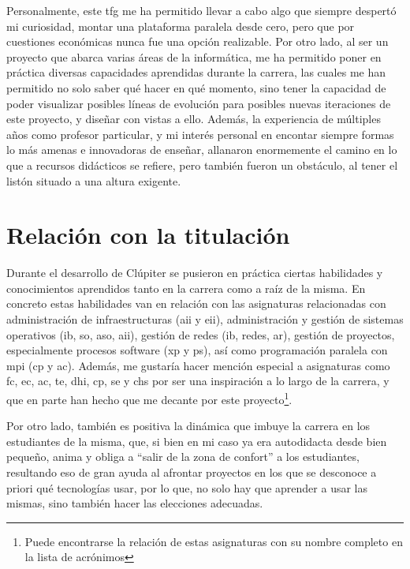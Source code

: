 Personalmente, este \acrshort{tfg} me ha permitido llevar a cabo algo que siempre despertó mi curiosidad, montar una plataforma paralela desde cero, pero que por cuestiones económicas nunca fue una opción realizable. Por otro lado, al ser un proyecto que abarca varias áreas de la informática, me ha permitido poner en práctica diversas capacidades aprendidas durante la carrera, las cuales me han permitido no solo saber qué hacer en qué momento, sino tener la capacidad de poder visualizar posibles líneas de evolución para posibles nuevas iteraciones de este proyecto, y diseñar con vistas a ello. Además, la experiencia de múltiples años como profesor particular, y mi interés personal en encontar siempre formas lo más amenas e innovadoras de enseñar, allanaron enormemente el camino en lo que a recursos didácticos se refiere, pero también fueron un obstáculo, al tener el listón situado a una altura exigente.

\section{Relación con la titulación}
Durante el desarrollo de Clúpiter se pusieron en práctica ciertas habilidades y conocimientos aprendidos tanto en la carrera como a raíz de la misma. En concreto estas habilidades van en relación con las asignaturas relacionadas con administración de infraestructuras (\acrshort{aii} y \acrshort{eii}), administración y gestión de sistemas operativos (\acrshort{ib}, \acrshort{so}, \acrshort{aso}, \acrshort{aii}), gestión de redes (\acrshort{ib}, redes, \acrshort{ar}), gestión de proyectos, especialmente procesos software (\acrshort{xp} y \acrshort{ps}), así como programación paralela con \acrshort{mpi} (\acrshort{cp} y \acrshort{ac}). Además, me gustaría hacer mención especial a asignaturas como \acrshort{fc}, \acrshort{ec}, \acrshort{ac}, \acrshort{te}, \acrshort{dhi}, \acrshort{cp}, \acrshort{se} y \acrshort{chs} por ser una inspiración a lo largo de la carrera, y que en parte han hecho que me decante por este proyecto\footnote{Puede encontrarse la relación de estas asignaturas con su nombre completo en la lista de acrónimos}.

Por otro lado, también es positiva la dinámica que imbuye la carrera en los estudiantes de la misma, que, si bien en mi caso ya era autodidacta desde bien pequeño, anima y obliga a ``salir de la zona de confort'' a los estudiantes, resultando eso de gran ayuda al afrontar proyectos en los que se desconoce a priori qué tecnologías usar, por lo que, no solo hay que aprender a usar las mismas, sino también hacer las elecciones adecuadas.

